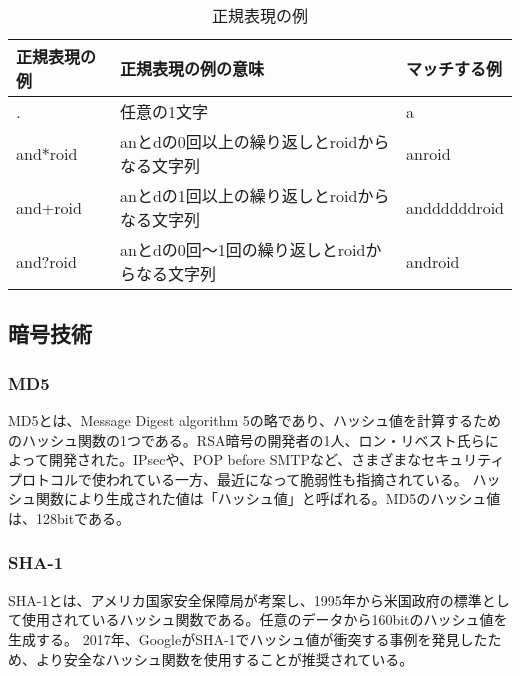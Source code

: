 \begin{table}[t]
\begin{center}
\caption{正規表現の例}
\begin{tabular}{lll} \hline
正規表現の例 & 正規表現の例の意味 & マッチする例 \\ \hline
. & 任意の1文字 & a \\
and$\ast$roid & anとdの0回以上の繰り返しとroidからなる文字列 & anroid \\
and+roid & anとdの1回以上の繰り返しとroidからなる文字列 & anddddddroid \\
and?roid & anとdの0回～1回の繰り返しとroidからなる文字列 & android \\ \hline
\end{tabular}
\label{tb:RegularExpression2}
\end{center}
\end{table}

\subsection{暗号技術}

\subsubsection {MD5}
MD5とは、Message Digest algorithm 5の略であり、ハッシュ値を計算するためのハッシュ関数の1つである。RSA暗号の開発者の1人、ロン・リベスト氏らによって開発された。IPsecや、POP before SMTPなど、さまざまなセキュリティプロトコルで使われている一方、最近になって脆弱性も指摘されている。
ハッシュ関数により生成された値は「ハッシュ値」と呼ばれる。MD5のハッシュ値は、128bitである。

\subsubsection {SHA-1}
SHA-1とは、アメリカ国家安全保障局が考案し、1995年から米国政府の標準として使用されているハッシュ関数である。任意のデータから160bitのハッシュ値を生成する。
2017年、GoogleがSHA-1でハッシュ値が衝突する事例\cite{INTERNET Watch}を発見したため、より安全なハッシュ関数を使用することが推奨されている。

